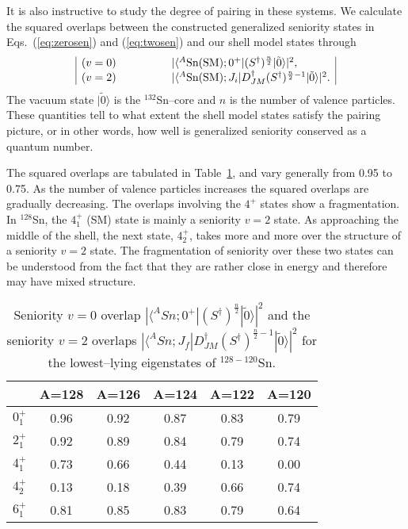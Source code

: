 \documentclass[twoside,12pt]{article}
\begin{document}
It is also instructive to study the degree of pairing in these systems.
We calculate the squared overlaps between the constructed generalized seniority
states in Eqs.~(\ref{eq:zerosen}) and (\ref{eq:twosen}) and our shell model states
through
\begin{equation}
\begin{array}{|lccccl|}
(v=0) & & & & &
|\langle ^{A}{\rm Sn(SM)} ;
0^{+}|(S^{\dagger})^{\frac{n}{2}}| \tilde{0} \rangle |^{2}, \\
(v=2) & & & & &
|\langle ^{A}{\rm Sn(SM)} ;
J_{i}|D^{\dagger}_{JM}(S^{\dagger})^{\frac{n}{2}-1}| \tilde{0} \rangle |^{2}. 
\end{array}
\end{equation}
The vacuum state $|\tilde{0} \rangle $ is the $^{132}$Sn--core and $n$ is
the number of valence particles. These quantities tell to what extent the 
shell model states satisfy the pairing picture, or in other words, how well 
is generalized seniority conserved as a quantum number.

The squared overlaps are tabulated in Table~\ref{tab:seniority}, and vary
generally from 0.95 to 0.75. As the number of valence particles increases the 
squared overlaps are gradually decreasing. The overlaps involving the $4^{+}$
states show a fragmentation. In $^{128}$Sn, the $4^{+}_{1}$ (SM)
state is mainly a seniority $v=2$ state. As approaching the middle of the 
shell, the next state, $4^{+}_{2}$, takes more and more over the 
structure of a seniority $v=2$ state. The fragmentation of seniority over these
two states can be understood from the fact that they are rather close in 
energy and therefore may have mixed structure.

\begin{table}[htbp]
\caption{ Seniority $v=0$ overlap 
         $|\langle ^{A}Sn;0^{+}|(S^{\dagger})^{\frac{n}{2}}| 
         \tilde{0} \rangle |^{2}$ and the seniority $v=2$ 
         overlaps $|\langle ^{A}Sn ;J_{f}|
         D^{\dagger}_{JM}(S^{\dagger})^{\frac{n}{2} - 1}| 
         \tilde{0} \rangle |^{2}$ for the lowest--lying eigenstates 
         of $^{128-120}$Sn.}
\label{tab:seniority}
\begin{center}
\begin{tabular}{|cccccc|}
\hline
 & A=128 & A=126 & A=124 & A=122 & A=120 \\ 
\hline
$0^{+}_{1}$ & 0.96 & 0.92 & 0.87 & 0.83 & 0.79 \\ 
$2^{+}_{1}$ & 0.92 & 0.89 & 0.84 & 0.79 & 0.74 \\ 
$4^{+}_{1}$ & 0.73 & 0.66 & 0.44 & 0.13 & 0.00 \\ 
$4^{+}_{2}$ & 0.13 & 0.18 & 0.39 & 0.66 & 0.74 \\
$6^{+}_{1}$ & 0.81 & 0.85 & 0.83 & 0.79 & 0.64 \\
\hline
\end{tabular}
\end{center}
\end{table}
\end{document}

